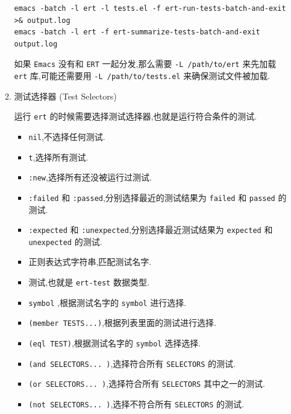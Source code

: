 \documentclass[11pt]{article}
\begin{document}
\begin{enumerate}
\begin{enumerate}
\begin{verbatim}
emacs -batch -l ert -l tests.el -f ert-run-tests-batch-and-exit >& output.log
emacs -batch -l ert -f ert-summarize-tests-batch-and-exit output.log
\end{verbatim}

如果 \texttt{Emacs} 没有和 \texttt{ERT} 一起分发,那么需要 \texttt{-L /path/to/ert} 来先加载 \texttt{ert} 库,可能还需要用 \texttt{-L /path/to/tests.el} 来确保测试文件被加载.


\item 测试选择器 (Test Selectors)
\label{sec:orgb776f6e}

运行 \texttt{ert} 的时候需要选择测试选择器,也就是运行符合条件的测试.

\begin{itemize}
\item \texttt{nil},不选择任何测试.

\item \texttt{t},选择所有测试.

\item \texttt{:new},选择所有还没被运行过测试.

\item \texttt{:failed} 和 \texttt{:passed},分别选择最近的测试结果为 \texttt{failed} 和 \texttt{passed} 的测试.

\item \texttt{:expected} 和 \texttt{:unexpected},分别选择最近测试结果为 \texttt{expected} 和 \texttt{unexpected} 的测试.

\item 正则表达式字符串,匹配测试名字.

\item 测试,也就是 \texttt{ert-test} 数据类型.

\item \texttt{symbol} ,根据测试名字的 \texttt{symbol} 进行选择.

\item \texttt{(member TESTS...)},根据列表里面的测试进行选择.

\item \texttt{(eql TEST)},根据测试名字的 \texttt{symbol} 选择选择.

\item \texttt{(and SELECTORS... )},选择符合所有 \texttt{SELECTORS} 的测试.

\item \texttt{(or SELECTORS... )},选择符合所有 \texttt{SELECTORS} 其中之一的测试.

\item \texttt{(not SELECTORS... )},选择不符合所有 \texttt{SELECTORS} 的测试.


\end{itemize}
\end{enumerate}
\end{enumerate}
\end{document}
